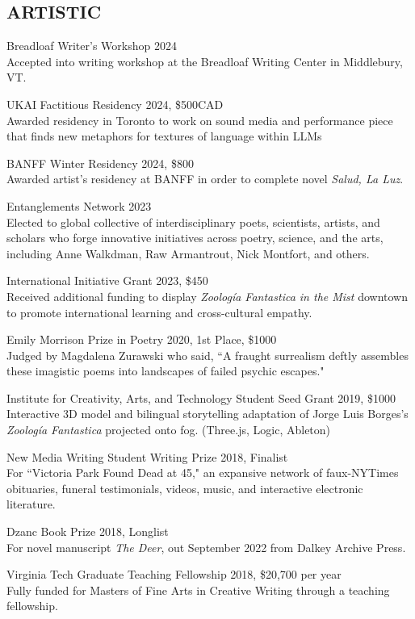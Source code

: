  \subsection{ARTISTIC}
 Breadloaf Writer's Workshop 2024\\
 Accepted into writing workshop at the Breadloaf Writing Center in Middlebury, VT. 
 
UKAI Factitious Residency 2024, \$500CAD\\
Awarded residency in Toronto to work on sound media and performance piece that finds new metaphors for textures of language within LLMs
 
BANFF Winter Residency 2024, \$800\\
Awarded artist's residency at BANFF in order to complete novel \emph{Salud, La Luz}.
 
Entanglements Network 2023 \\
 Elected to global collective of interdisciplinary poets, scientists, artists, and scholars who forge innovative initiatives across poetry, science, and the arts, including Anne Walkdman, Raw Armantrout, Nick Montfort, and others. 
 
 International Initiative Grant 2023, \$450  \\
Received additional funding to display \emph{Zoolog\'ia Fantastica in the Mist} downtown to promote international learning and cross-cultural empathy. 

Emily Morrison Prize in Poetry 2020, 1st Place,  \$1000  \\
Judged by Magdalena Zurawski who said, ``A fraught surrealism deftly assembles these imagistic poems into landscapes of failed psychic escapes."
 
 Institute for Creativity, Arts, and Technology Student Seed Grant 2019, \$1000  \\
Interactive 3D model and bilingual storytelling adaptation of Jorge Luis Borges's \emph{Zoolog\'ia Fantastica} projected onto fog. (Three.js, Logic, Ableton)

New Media Writing Student Writing Prize 2018, Finalist\\
For ``Victoria Park Found Dead at 45," an expansive network of faux-NYTimes obituaries, funeral testimonials, videos, music, and interactive electronic literature. 

Dzanc Book Prize 2018, Longlist \\
For novel manuscript \emph{The Deer}, out September 2022 from Dalkey Archive Press.

Virginia Tech Graduate Teaching Fellowship 2018, \$20,700 per year \\
Fully funded for Masters of Fine Arts in Creative Writing through a teaching fellowship.

